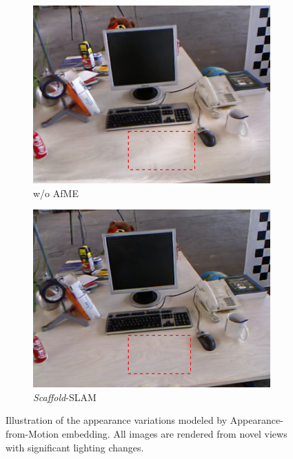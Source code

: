 \begin{figure}[t]
	\centering
    \begin{subfigure}[ht]{0.495\linewidth}
        \includegraphics[width=1\linewidth]{fig/fig_AE/base+FRP/30000_10_mark.jpg}
        \caption{w/o AfME}
    \end{subfigure}    \hspace{-1.5mm}
    \begin{subfigure}[ht]{0.495\linewidth}
        \includegraphics[width=1\linewidth]{fig/fig_AE/ours/30000_10_mark.jpg}
        \caption{ \emph{Scaffold}-SLAM}
    \end{subfigure}    
	\caption{Illustration of the appearance variations  modeled by Appearance-from-Motion embedding. All images are rendered from novel views with significant lighting changes.}
	\label{fig:result_include1}
\end{figure}
